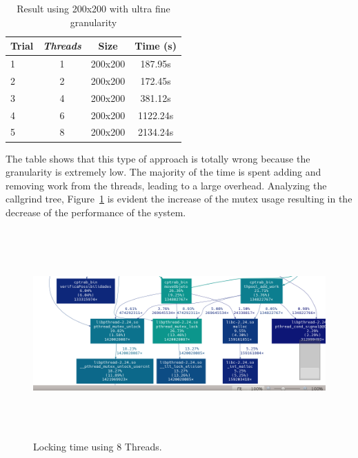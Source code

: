 \documentclass[10pt,a4paper,final]{report}
\begin{document}
\begin{table}[H]
  \begin{center}
     \begin{tabular}{ | l | c | c | c |}
      \hline
      \textbf{Trial} & \textbf{\textit{Threads}} & \textbf{Size} & \textbf{Time (s)}\\ \hline
      1 & 1 & 200x200 & 187.95s \\ \hline
      2 & 2 & 200x200 & 172.45s \\ \hline
      3 & 4 & 200x200 & 381.12s  \\ \hline
      4 & 6 & 200x200 & 1122.24s \\ \hline
      5 & 8 & 200x200 & 2134.24s \\ \hline
      
  \end{tabular}
  \caption{Result using 200x200 with ultra fine granularity}
  \label{tbl:resultados4}
  \end{center}
\end{table}

The table shows that this type of approach is totally wrong because the  granularity is extremely low. The majority of the time is spent adding and removing work from the threads, leading to a large overhead. Analyzing the callgrind tree, Figure~\ref{fig_mp2} is evident the increase of the mutex usage resulting in the decrease of the performance of the system.

\begin{figure}[H]
      \centering
      \includegraphics[height=8cm,width=12cm]{sub_grafico_mp2_8_200x200_Lock.png}
	        
      \caption{Locking time using 8 Threads.}
      \label{fig_mp2}
\end{figure}
\end{document}
